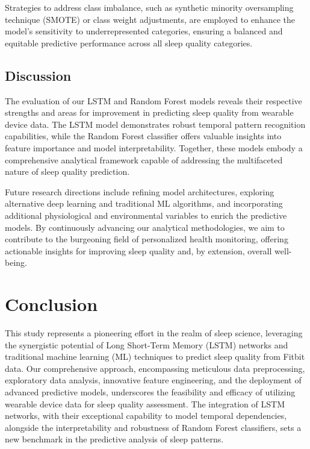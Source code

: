 \documentclass[10pt]{extarticle}
\begin{document}
Strategies to address class imbalance, such as synthetic minority oversampling technique (SMOTE) or class weight adjustments, are employed to enhance the model's sensitivity to underrepresented categories, ensuring a balanced and equitable predictive performance across all sleep quality categories.

\subsection{Discussion}

The evaluation of our LSTM and Random Forest models reveals their respective strengths and areas for improvement in predicting sleep quality from wearable device data. The LSTM model demonstrates robust temporal pattern recognition capabilities, while the Random Forest classifier offers valuable insights into feature importance and model interpretability. Together, these models embody a comprehensive analytical framework capable of addressing the multifaceted nature of sleep quality prediction.

Future research directions include refining model architectures, exploring alternative deep learning and traditional ML algorithms, and incorporating additional physiological and environmental variables to enrich the predictive models. By continuously advancing our analytical methodologies, we aim to contribute to the burgeoning field of personalized health monitoring, offering actionable insights for improving sleep quality and, by extension, overall well-being.

\section{Conclusion}

This study represents a pioneering effort in the realm of sleep science, leveraging the synergistic potential of Long Short-Term Memory (LSTM) networks and traditional machine learning (ML) techniques to predict sleep quality from Fitbit data. Our comprehensive approach, encompassing meticulous data preprocessing, exploratory data analysis, innovative feature engineering, and the deployment of advanced predictive models, underscores the feasibility and efficacy of utilizing wearable device data for sleep quality assessment. The integration of LSTM networks, with their exceptional capability to model temporal dependencies, alongside the interpretability and robustness of Random Forest classifiers, sets a new benchmark in the predictive analysis of sleep patterns.
\end{document}
